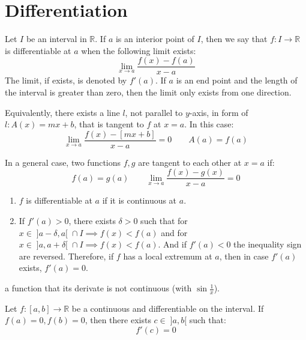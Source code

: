 \chapter{Differentiation}
\thispagestyle{headings}

\begin{definition}
    Let \(I\) be an interval in \(\mathbb{R}\). If \(a\) is an interior point of \(I\), then we say that \(f: I \to \mathbb{R}\) is differentiable at \(a\) when the following limit exists:
    \[\lim_{x \to a} \dfrac{f(x) - f(a)}{x - a} \]
    The limit, if exists, is denoted by \(f'(a)\).
    If \(a\) is an end point and the length of the interval is greater than zero, then the limit only exists from one direction.

    Equivalently, there exists a line \(l\), not parallel to \(y\)-axis, in form of \(l : A(x) = mx + b\), that is tangent to \(f\) at \(x = a\). In this case:
    \[\lim_{x \to a}\dfrac{f(x) - [mx + b]}{x - a } = 0 \qquad A(a) = f(a) \]
\end{definition}
In a general case, two functions \(f,g\) are tangent to each other at \(x = a\) if:
\begin{equation}
    f(a) = g(a) \qquad \lim_{x \to a}{\dfrac{f(x) - g(x)}{x - a} = 0}
\end{equation}
\begin{corollary}\leavevmode
    \begin{enumerate}
        \item \(f\) is differentiable at \(a\) if it is continuous at \(a\).
        \item \label{extrma} If \(f'(a) > 0\), there exists \(\delta > 0\) such that for \(x \in \; ]a- \delta,a[\; \cap I \implies f(x) < f(a) \) and for \(x \in \; ]a, a +  \delta[\; \cap I \implies f(x) < f(a)\). And if \(f'(a) < 0\) the inequality sign are reversed. Therefore, if \(f\) has a local extremum at \(a\), then in case \(f'(a)\) exists, \(f'(a) = 0\).
    \end{enumerate}
\end{corollary}
\begin{example}
    a function that its derivate is not continuous (with \(\sin\frac{1}{x}\)).
\end{example}
\begin{theorem} \label{Rolle}
    Let \(f: [a,b] \to \mathbb{R}\) be a continuous and differentiable on the interval. If \(f(a) = 0, f(b) = 0\), then there exists \(c \in \; ]a,b[\) such that:
    \[f'(c) = 0\]
\end{theorem}
